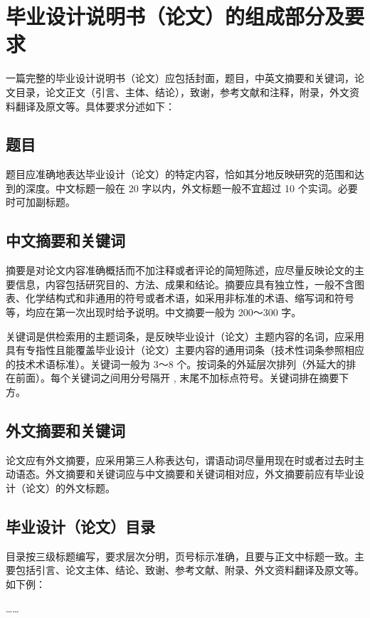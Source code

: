 \section{毕业设计说明书（论文）的组成部分及要求}

一篇完整的毕业设计说明书（论文）应包括封面，题目，中英文摘要和关键词，论文目录，论文正文（引言、主体、结论），致谢，参考文献和注释，附录，外文资料翻译及原文等。具体要求分述如下：

\subsection{题目}

题目应准确地表达毕业设计（论文）的特定内容，恰如其分地反映研究的范围和达到的深度。中文标题一般在
20 字以内，外文标题一般不宜超过 10 个实词。必要时可加副标题。

\subsection{中文摘要和关键词}

摘要是对论文内容准确概括而不加注释或者评论的简短陈述，应尽量反映论文的主要信息，内容包括研究目的、方法、成果和结论。摘要应具有独立性，一般不含图表、化学结构式和非通用的符号或者术语，如采用非标准的术语、缩写词和符号等，均应在第一次出现时给予说明。中文摘要一般为
200～300 字。

关键词是供检索用的主题词条，是反映毕业设计（论文）主题内容的名词，应采用具有专指性且能覆盖毕业设计（论文）主要内容的通用词条（技术性词条参照相应的技术术语标准）。关键词一般为
3～8
个。按词条的外延层次排列（外延大的排在前面）。每个关键词之间用分号隔开 ,
末尾不加标点符号。关键词排在摘要下方。

\subsection{外文摘要和关键词}

论文应有外文摘要，应采用第三人称表达句，谓语动词尽量用现在时或者过去时主动语态。外文摘要和关键词应与中文摘要和关键词相对应，外文摘要前应有毕业设计（论文）的外文标题。

\subsection{毕业设计（论文）目录}

目录按三级标题编写，要求层次分明，页号标示准确，且要与正文中标题一致。主要包括引言、论文主体、结论、致谢、参考文献、附录、外文资料翻译及原文等。如下例：

……
